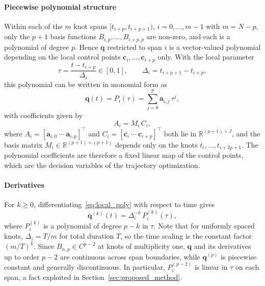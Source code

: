 \documentclass[final,5p,times,twocolumn]{elsarticle}
\theoremstyle{definition}
\begin{document}
\paragraph*{Piecewise polynomial structure}
Within each of the $m$ knot spans $[t_{i+p},t_{i+p+1})$, $i=0,\dots,m-1$ with $m=N-p$, only the $p+1$ basis functions $B_{i,p},\dots,B_{i+p,p}$ are non-zero, and each is a polynomial of degree $p$. Hence $\mathbf{q}$ restricted to span $i$ is a vector-valued polynomial depending on the local control points $\mathbf{c}_i,\dots,\mathbf{c}_{i+p}$ only. With the local parameter
\begin{equation}
  \tau=\frac{t-t_{i+p}}{\Delta_i}\in[0,1],\qquad \Delta_i=t_{i+p+1}-t_{i+p},
\end{equation}
this polynomial can be written in monomial form as
\begin{equation}
  \mathbf{q}(t)=P_i(\tau)=\sum_{j=0}^{p}\mathbf{a}_{i,j}\,\tau^{j},
  \label{eq:local_poly}
\end{equation}
with coefficients given by
\begin{equation}
  A_i = M_i\,C_i,
  \label{eq:coeff_map}
\end{equation}
where $A_i=[\mathbf{a}_{i,0}\ \cdots\ \mathbf{a}_{i,p}]^{\top}$ and $C_i=[\mathbf{c}_i\ \cdots\ \mathbf{c}_{i+p}]^{\top}$ both lie in $\mathbb{R}^{(p+1)\times J}$, and the basis matrix $M_i\in\mathbb{R}^{(p+1)\times(p+1)}$ depends only on the knots $t_i,\dots,t_{i+2p+1}$.
The polynomial coefficients are therefore a fixed linear map of the control points, which are the decision variables of the trajectory optimization.

\paragraph*{Derivatives}
For $k\ge 0$, differentiating~\eqref{eq:local_poly} with respect to time gives
\begin{equation}
  \mathbf{q}^{(k)}(t)=\Delta_i^{-k}\,P_i^{(k)}(\tau),
\end{equation}
where $P_i^{(k)}$ is a polynomial of degree $p-k$ in $\tau$. Note that for uniformly spaced knots, $\Delta_i=T/m$ for total duration $T$, so the time scaling is the constant factor $(m/T)^k$. Since $B_{n,p}\in C^{p-2}$ at knots of multiplicity one, $\mathbf{q}$ and its derivatives up to order $p-2$ are continuous across span boundaries, while $\mathbf{q}^{(p)}$ is piecewise constant and generally discontinuous. In particular, $P_i^{(p-2)}$ is linear in $\tau$ on each span, a fact exploited in Section~\ref{sec:proposed_method}.
\end{document}
